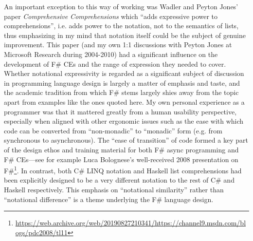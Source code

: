 \documentclass[acmsmall]{acmart}\settopmatter{}
\begin{document}
An important exception to this way of working was Wadler and Peyton Jones' paper
\textit{Comprehensive Comprehensions} \citep{ComprehensiveCOmprehensions} which
``adds expressive power to comprehensions'', i.e. adds power to the notation, not to the semantics of lists, thus emphasizing in my mind that
notation itself could be the subject of genuine improvement.
This paper (and my own 1:1 discussions with Peyton Jones at Microsoft Research during 2004-2010) had a significant influence on the
development of F\# CEs and the range of expression they needed to cover. Whether notational expressivity is regarded as
a significant subject of discussion in programming language design is largely a matter of emphasis and taste, and the academic
tradition from which F\# stems largely shies away from the topic apart from examples like the ones quoted here.
My own personal experience as a programmer was that it mattered greatly from a human usability perspective, especially
when aligned with other ergonomic issues such as the ease with which code can be converted from ``non-monadic'' to ``monadic''
form (e.g. from synchronous to asynchronous). The ``ease of transition'' of code formed a key part
of the design ethos and training material for both F\# async programming and F\#  CEs---see for example Luca Bolognese's
well-received 2008 presentation on F\#\footnote{\url{https://web.archive.org/web/20190827210341/https://channel9.msdn.com/blogs/pdc2008/tl11}}.  In contrast, both C\# LINQ notation
and Haskell list comprehensions had been explicitly designed to be a very different notation to the rest of C\# and Haskell respectively.
This emphasis on ``notational similarity'' rather than ``notational difference'' is a theme underlying the F\# language design.
\end{document}
